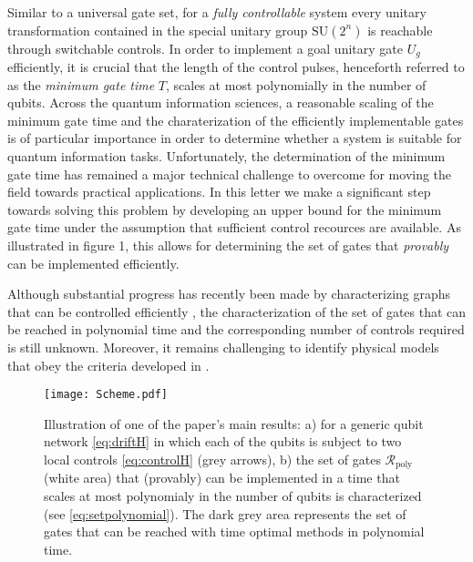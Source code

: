 \documentclass[aps,twocolumn,amsmath,amssymb,nofootinbib,superscriptaddress]{revtex4-1}
\begin{document}
Similar to a universal gate set, for a \emph{fully controllable} system every unitary transformation contained in the special unitary group $\text{SU}(2^{n})$ is reachable through switchable controls. In order to implement a goal unitary gate $U_{g}$ efficiently, it is crucial that the length of the control pulses, henceforth referred to as the \emph{minimum gate time} $T$, scales at most polynomially in the number of qubits. Across the quantum information sciences, a reasonable scaling of the minimum gate time and the charaterization of the efficiently implementable gates is of particular importance in order to determine whether a system is suitable for quantum information tasks. Unfortunately, the determination of the minimum gate time has remained a major technical challenge to overcome for moving the field towards practical applications. In this letter we make a significant step towards solving this problem by developing an upper bound for the minimum gate time under the assumption that sufficient control recources are available. As illustrated in figure 1, this allows for determining the set of gates that \emph{provably} can be implemented efficiently. 

Although  substantial progress has recently been made by characterizing graphs that can be controlled efficiently \cite{Lloyd}, the characterization of the set of gates that can be reached in polynomial time and the corresponding number of controls required is still unknown. Moreover, it remains challenging to identify physical models that obey the criteria developed in \cite{Lloyd}. 
  \begin{figure}[!h]
  \texttt{[image: Scheme.pdf]}
 \caption{\label{fig:illustration} Illustration of one of the paper's main results: a) for a generic qubit network \eqref{eq:driftH} in which each of the qubits is subject to two local controls \eqref{eq:controlH} (grey arrows), b) the set of gates $\mathcal R_{\text{poly}}$ (white area) that (provably) can be implemented in a time that scales at most polynomialy in the number of qubits is characterized (see \eqref{eq:setpolynomial}). The dark grey area represents the set of gates that can be reached with time optimal methods in polynomial time.}
\end{figure}
\end{document}
